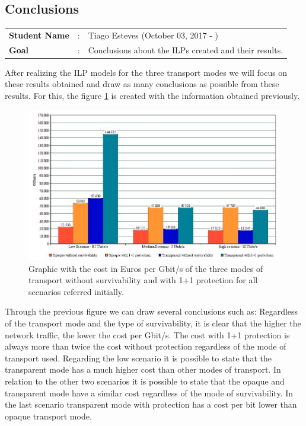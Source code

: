\clearpage

\subsection{Conclusions}
\begin{tcolorbox}	
\begin{tabular}{p{2.75cm} p{0.2cm} p{10.5cm}} 	
\textbf{Student Name}  &:& Tiago Esteves    (October 03, 2017 - )\\
\textbf{Goal}          &:& Conclusions about the ILPs created and their results.
\end{tabular}
\end{tcolorbox}
\vspace{11pt}

After realizing the ILP models for the three transport modes we will focus on these results obtained and draw as many conclusions as possible from these results. For this, the figure \ref{graphic_comparative} is created with the information obtained previously.

\begin{figure}[h!]
\centering
\includegraphics[width=\textwidth]{sdf/ilp/figures/comparative_image}
\caption{Graphic with the cost in Euros per Gbit/s of the three modes of transport without survivability and with 1+1 protection for all scenarios referred initially.}
\label{graphic_comparative}
\end{figure}

Through the previous figure we can draw several conclusions such as:
Regardless of the transport mode and the type of survivability, it is clear that the higher the network traffic, the lower the cost per Gbit/s.
The cost with 1+1 protection is always more than twice the cost without protection regardless of the mode of transport used.
Regarding the low scenario it is possible to state that the transparent mode has a much higher cost than other modes of transport.
In relation to the other two scenarios it is possible to state that the opaque and transparent mode have a similar cost regardless of the mode of survivability. In the last scenario transparent mode with protection has a cost per bit lower than opaque transport mode.
